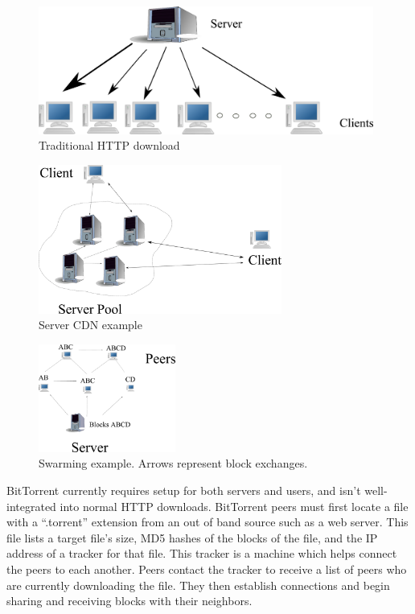 \begin{figure}
\begin{center}
   \includegraphics[width=11cm]{description_pics/traditional_http.png}
    \caption{Traditional HTTP download}
 \label{fig:traditional_http}
 \end{center}
\end{figure}
\begin{figure}
    \centering
  \includegraphics[width=8cm]{description_pics/server_side_only.png}
  \caption{Server CDN example}
  \label{fig:server_only}
\end{figure}   
\begin{figure}
 \centering
 \includegraphics[width=4.5cm]{description_pics/normal_swarm.png}
 \caption{Swarming example.  Arrows represent block exchanges.}
 \label{fig:normal_swarm}
\end{figure}

BitTorrent currently requires setup for both servers and users, and isn't well-integrated into normal HTTP downloads.  BitTorrent peers must first locate a file with a ``.torrent'' extension from an out of band source such as a web server.  This file lists a target file's size, MD5 hashes of the blocks of the file, and the IP address of a tracker for that file.  This tracker is a machine which helps connect the peers to each another.  Peers contact the tracker to receive a list of peers who are currently downloading the file.  They then establish connections and begin sharing and receiving blocks with their neighbors.

